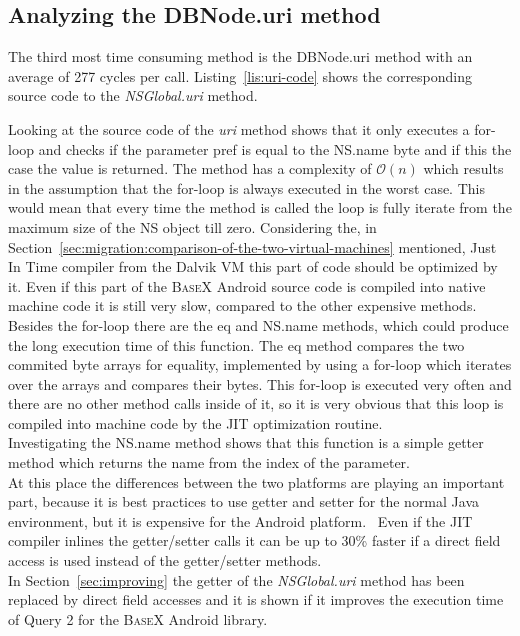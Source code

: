 \subsection*{Analyzing the \textsf{DBNode.uri} method}
\label{sec:analyzing-the-dbnode.uri-method}
The third most time consuming method is the \textsf{DBNode.uri} method with an average of 277 cycles per call.
Listing~\ref{lis:uri-code} shows the corresponding source code to the \textit{NSGlobal.uri} method.
		
Looking at the source code of the \textit{uri} method shows that it only executes a for-loop and checks if the parameter \textsf{pref} is equal to the \textsf{NS.name} byte and if this the case the value is returned.
The method has a complexity of $\mathcal O(n)$ which results in the assumption that the for-loop is always executed in the worst case.
This would mean that every time the method is called the loop is fully iterate from the maximum size of the \textsf{NS} object till zero.
Considering the, in Section~\ref{sec:migration:comparison-of-the-two-virtual-machines} mentioned, Just In Time compiler from the Dalvik VM this part of code should be optimized by it.
Even if this part of the \textsc{BaseX} Android source code is compiled into native machine code it is still very slow, compared to the other expensive methods.
Besides the for-loop there are the \textsf{eq} and \textsf{NS.name} methods, which could produce the long execution time of this function.
The \textsf{eq} method compares the two commited byte arrays for equality, implemented by using a for-loop which iterates over the arrays and compares their bytes.
This for-loop is executed very often and there are no other method calls inside of it, so it is very obvious that this loop is compiled into machine code by the JIT optimization routine.\\
Investigating the \textsf{NS.name} method shows that this function is a simple getter method which returns the name from the index of the parameter.\\
At this place the differences between the two platforms are playing an important part, because it is best practices to use getter and setter for the normal Java environment, but it is expensive for the Android platform.~\cite{toninievlautatingandroid}
Even if the JIT compiler inlines the getter/setter calls it can be up to 30\% faster if a direct field access is used instead of the getter/setter methods.~\cite{toninianalysis}\\
In Section~\ref{sec:improving} the getter of the \textit{NSGlobal.uri} method has been replaced by direct field accesses and it is shown if it improves the execution time of Query 2 for the \textsc{BaseX} Android library.

